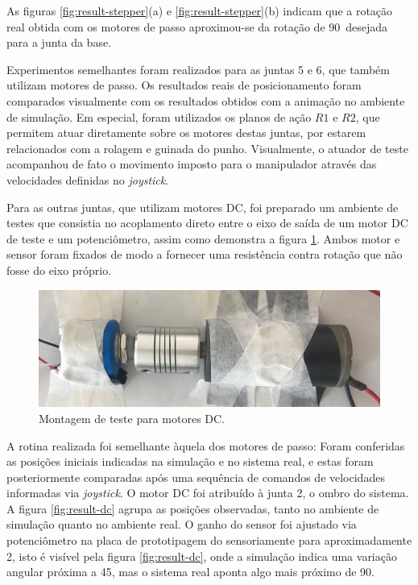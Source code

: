 As figuras \ref{fig:result-stepper}(a) e \ref{fig:result-stepper}(b) indicam que a rotação
real obtida com os motores de passo aproximou-se da rotação de 90\textdegree\, desejada para
a junta da base. 

Experimentos semelhantes foram realizados para as juntas 5 e 6, que também utilizam motores 
de passo. Os resultados reais de posicionamento foram comparados visualmente com os resultados
obtidos com a animação no ambiente de simulação. Em especial, foram utilizados os planos de ação
$R1$ e $R2$, que permitem atuar diretamente sobre os motores destas juntas, por estarem
relacionados com a rolagem e guinada do punho.
Visualmente, o atuador de teste acompanhou de fato o movimento imposto para o manipulador através das 
velocidades definidas no \textit{joystick}.

Para as outras juntas, que utilizam motores DC, foi preparado um ambiente de testes que consistia
no acoplamento direto entre o eixo de saída de um motor DC de teste e um potenciômetro, assim
como demonstra a figura \ref{fig:teste-dc}. Ambos motor e sensor foram fixados de modo a fornecer
uma resistência contra rotação que não fosse do eixo próprio.

\begin{figure}[h!]
    \begin{centering}

    \includegraphics[width=0.8\columnwidth]{images/resultados/teste-dc.jpeg}

\caption{Montagem de teste para motores DC.}
\label{fig:teste-dc}

\par\end{centering}
\end{figure}

A rotina realizada foi semelhante àquela dos motores de passo: Foram conferidas as posições iniciais
indicadas na simulação e no sistema real, e estas foram posteriormente comparadas após uma
sequência de comandos de velocidades informadas via \textit{joystick}. O motor DC foi atribuído à junta 2,
o ombro do sistema. 
A figura \ref{fig:result-dc} agrupa as posições observadas, tanto no ambiente de simulação quanto no ambiente 
real. O ganho do sensor foi ajustado via potenciômetro na placa de prototipagem do sensoriamente para
aproximadamente 2, isto é visível pela figura \ref{fig:result-dc}, onde a simulação indica uma variação
angular próxima a 45\textdegree, mas o sistema real aponta algo mais próximo de 90\textdegree.

